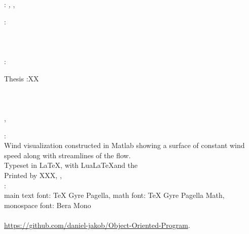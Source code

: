 \thispagestyle{empty}

\hfill

\vfill

\noindent\myName: \textit{\myTitle,} \mySubtitle, %
\textcopyright\ ~

\bigskip

\noindent{}: \\
\myProf \\
\myOtherProf \\
\mySupervisor \\
\noindent{}:\\
\myExaminer

\bigskip
\noindent\myDegree Thesis :XX\\
\noindent\myDepartment\\
\noindent\myFaculty\\
\noindent\myUni\\
\noindent\myLocation, \myCountry

\vfill


\noindent{}: \\
Wind visualization constructed in Matlab showing a surface of constant wind speed along with streamlines of the flow.\\
\medskip
\noindent Typeset in \LaTeX, with Lua\LaTeX and the \ctVersion\\
\noindent Printed by XXX, , \myPrintLocation\\
\noindent{}: \\
\noindent main text font: TeX Gyre Pagella, math font: TeX Gyre Pagella Math, monospace font: Bera Mono\\
\noindent{}\\
\url{https://github.com/daniel-jakob/Object-Oriented-Program}.